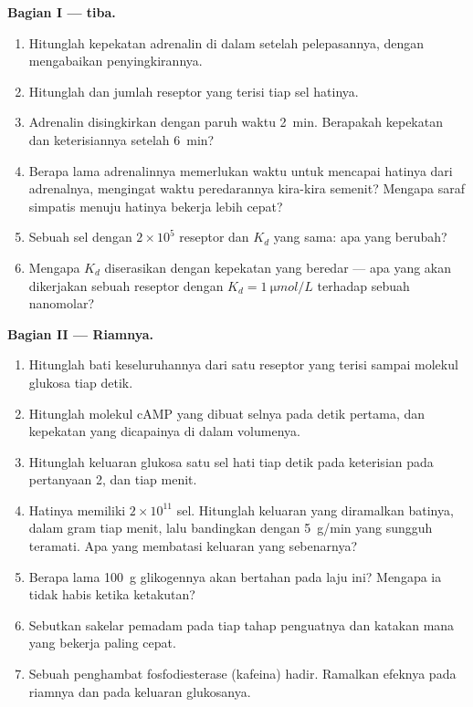 \begin{problem}
\medskip
\noindent\textbf{Bagian I ---  tiba.}
\begin{enumerate}
  \item Hitunglah kepekatan adrenalin di dalam  setelah
        pelepasannya, dengan mengabaikan penyingkirannya.
  \item Hitunglah  dan jumlah reseptor yang
        terisi tiap sel hatinya.
  \item Adrenalin disingkirkan dengan paruh waktu \qty{2}{min}.
        Berapakah kepekatan dan keterisiannya setelah \qty{6}{min}?
  \item Berapa lama adrenalinnya memerlukan waktu untuk mencapai
        hatinya dari adrenalnya, mengingat waktu peredarannya
        kira-kira semenit? Mengapa saraf simpatis menuju hatinya
        bekerja lebih cepat?
  \item Sebuah sel dengan $2\times 10^{5}$ reseptor dan $K_d$ yang
        sama: apa yang berubah?
  \item Mengapa $K_d$ diserasikan dengan kepekatan yang beredar ---
        apa yang akan dikerjakan sebuah reseptor dengan
        $K_d = \qty{1}{\micro mol/L}$ terhadap sebuah  nanomolar?
\end{enumerate}

\medskip
\noindent\textbf{Bagian II --- Riamnya.}
\begin{enumerate}[resume]
  \item Hitunglah bati keseluruhannya dari satu reseptor yang terisi
        sampai molekul glukosa tiap detik.
  \item Hitunglah molekul cAMP yang dibuat selnya pada detik pertama,
        dan kepekatan yang dicapainya di dalam volumenya.
  \item Hitunglah keluaran glukosa satu sel hati tiap detik pada
        keterisian pada pertanyaan 2, dan tiap menit.
  \item Hatinya memiliki $2\times 10^{11}$ sel. Hitunglah keluaran
        yang diramalkan batinya, dalam gram tiap menit, lalu
        bandingkan dengan \qty{5}{g/min} yang sungguh teramati. Apa
        yang membatasi keluaran yang sebenarnya?
  \item Berapa lama \qty{100}{g} glikogennya akan bertahan pada laju
        ini? Mengapa ia tidak habis ketika ketakutan?
  \item Sebutkan sakelar pemadam pada tiap tahap penguatnya dan
        katakan mana yang bekerja paling cepat.
  \item Sebuah penghambat fosfodiesterase (kafeina) hadir. Ramalkan
        efeknya pada riamnya dan pada keluaran glukosanya.
\end{enumerate}


\end{problem}
